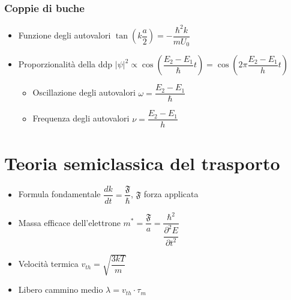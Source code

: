 \documentclass{article}
\begin{document}
\subsubsection{Coppie di buche}
\begin{itemize}
  \item Funzione degli autovalori \( \tan\left( k \dfrac{a}{2} \right) = - \dfrac{\hbar ^2 k}{m U_0} \)
  \item Proporzionalità della ddp \( \left| \psi \right| ^ 2 \propto \cos \left( \dfrac{E_2 - E_1}{\hbar} t \right) = \cos \left( 2 \pi \dfrac{E_2 - E_1}{h} t \right)  \)
        \begin{itemize}
          \item Oscillazione degli autovalori \( \omega = \dfrac{E_2 - E_1}{\hbar} \)
          \item Frequenza degli autovalori \( \nu = \dfrac{E_2 - E_1}{h} \)
        \end{itemize}
\end{itemize}

\section{Teoria semiclassica del trasporto}
\begin{itemize}
  \item Formula fondamentale \( \dfrac{dk}{dt} = \dfrac{\mathfrak{F} }{\hbar} \), \( \mathfrak{F}  \) forza applicata
  \item Massa efficace dell'elettrone \( m ^ \ast = \dfrac{ \mathfrak{F} }{a} = \dfrac{\hbar ^ 2}{\dfrac{\partial ^ 2 E}{\partial t ^ 2}} \)
  \item Velocità termica \( v_{th} = \sqrt{\dfrac{3 k T}{m}} \)
  \item Libero cammino medio \( \lambda = v_{th} \cdot \tau_m \)
\end{itemize}
\end{document}
